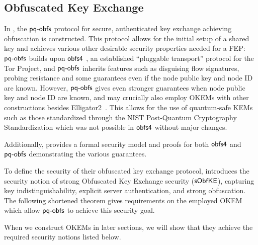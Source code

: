 \subsection{Obfuscated Key Exchange}

In \cite{CCS:GunSteVei24}, the $\textsf{pq-obfs}$ protocol for secure, authenticated key exchange achieving obfuscation is constructed. This protocol allows for the initial setup of a shared key and achieves various other desirable security properties needed for a FEP:
$\textsf{pq-obfs}$ builds upon $\textsf{obfs4}$ \cite{obfs4}, an established ``pluggable transport'' protocol for the Tor Project, and $\textsf{pq-obfs}$ inherits features such as disguising flow signatures, probing resistance and some guarantees even if the node public key and node ID are known.
However, $\textsf{pq-obfs}$ gives even stronger guarantees when node public key and node ID are known, and may crucially also employ OKEMs with other constructions besides \textsf{Elligator2}~\cite{CCS:BHKL13}. This allows for the use of quantum-safe KEMs such as those standardized through the NIST Post-Quantum Cryptography Standardization \cite{nist-standardization} which was not possible in $\textsf{obfs4}$ without major changes.

Additionally, \cite{CCS:GunSteVei24} provides a formal security model and proofs for both $\textsf{obfs4}$ and $\textsf{pq-obfs}$ demonstrating the various guarantees.

To define the security of their obfuscated key exchange protocol, \cite{CCS:GunSteVei24} introduces the security notion of strong Obfuscated Key Exchange security ($\mathsf{sObfKE}$), capturing key indistinguishability, explicit server authentication, and strong obfuscation.
The following shortened theorem gives requirements on the employed OKEM which allow $\textsf{pq-obfs}$ to achieve this security goal.

When we construct OKEMs in later sections, we will show that they achieve the required security notions listed below.

